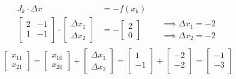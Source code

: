 \documentclass[12pt]{article}
\begin{document}
\begin{enumerate}
\begin{solution}
              \begin{align*}
                  J_k \cdot \Delta x                                                         & = - f(x_k)                                                               \\
                  \begin{bmatrix}
                      2 & -1 \\
                      1 & -1 \\
                  \end{bmatrix} \cdot \begin{bmatrix} \Delta x_1 \\ \Delta x_2 \end{bmatrix} & = - \begin{bmatrix} 2 \\ 0 \end{bmatrix} \qquad \begin{matrix}
                                                                                                                                                   \implies \Delta x_1 = -2 \\
                                                                                                                                                   \implies \Delta x_2 = -2
                                                                                                                                               \end{matrix} \\
              \end{align*}
              \begin{equation*}
                  \begin{bmatrix}
                      x_{11} \\ x_{21}
                  \end{bmatrix} = \begin{bmatrix}
                      x_{10} \\ x_{20}
                  \end{bmatrix} + \begin{bmatrix}
                      \Delta x_1 \\ \Delta x_2
                  \end{bmatrix} = \begin{bmatrix}
                      1 \\ -1 \\
                  \end{bmatrix} + \begin{bmatrix}
                      -2 \\ -2 \\
                  \end{bmatrix} = \begin{bmatrix}
                      -1 \\ -3 \\
                  \end{bmatrix}
              \end{equation*}
          \end{solution}

\end{enumerate}
\end{document}
